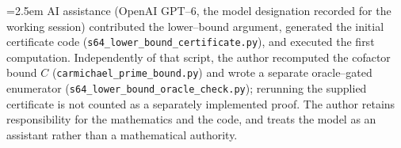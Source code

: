 \documentclass[11pt]{article}
\theoremstyle{definition}
\newcommand{\code}[1]{\texttt{#1}}
\begin{document}
{\emergencystretch=2.5em
AI assistance (OpenAI GPT--6, the model designation recorded for the working session) contributed
the lower--bound argument, generated the initial certificate code
(\code{s64\_\allowbreak lower\_\allowbreak bound\_\allowbreak certificate.py}), and executed the first computation. Independently of that
script, the author recomputed the cofactor bound $C$ (\code{carmichael\_\allowbreak prime\_\allowbreak bound.py}) and wrote
a separate oracle--gated enumerator (\code{s64\_\allowbreak lower\_\allowbreak bound\_\allowbreak oracle\_\allowbreak check.py}); rerunning the
supplied certificate is not counted as a separately implemented proof. The author retains
responsibility for the mathematics and the code, and treats the model as an assistant rather than a
mathematical authority.\par}
\end{document}
